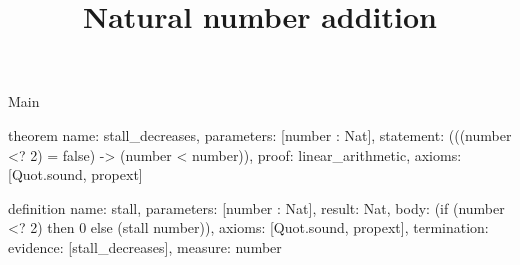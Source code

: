 \begin{lexlean}{Main}
\title{Natural number addition}
\begin{semanticmodule}
theorem{
  name: stall_decreases,
  parameters: [number : Nat],
  statement: (((number <? 2) = false) -> (number < number)),
  proof: linear_arithmetic{},
  axioms: [Quot.sound, propext]
}

definition{
  name: stall,
  parameters: [number : Nat],
  result: Nat,
  body: (if (number <? 2) then 0 else (stall number)),
  axioms: [Quot.sound, propext],
  termination: {evidence: [stall_decreases], measure: number}
}
\end{semanticmodule}
\end{lexlean}
